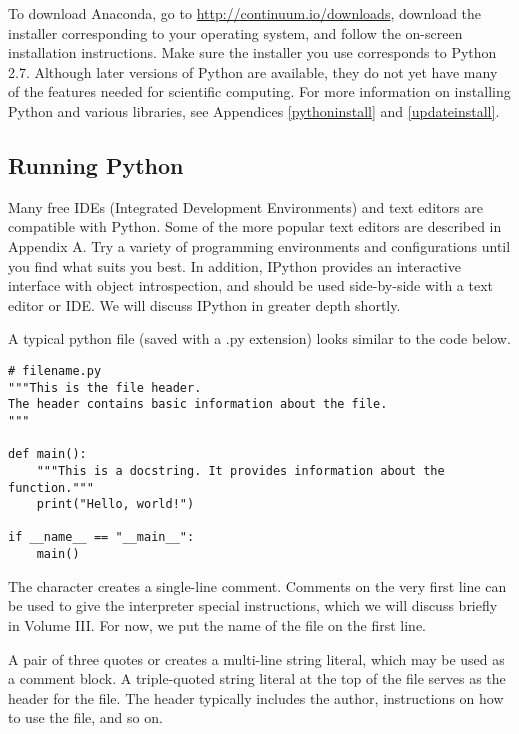 To download Anaconda, go to \url{http://continuum.io/downloads}, download the installer corresponding to your operating system, and follow the on-screen installation instructions. 
Make sure the installer you use corresponds to Python 2.7.
Although later versions of Python are available, they do not yet have many of the features needed for scientific computing. %
For more information on installing Python and various libraries, see Appendices \ref{pythoninstall} and \ref{updateinstall}.

\subsection*{Running Python} %

Many free IDEs (Integrated Development Environments) and text editors are compatible with Python.
Some of the more popular text editors are described in Appendix A.
Try a variety of programming environments and configurations until you find what suits you best.
In addition, IPython provides an interactive interface with object introspection, and should be used side-by-side with a text editor or IDE.
We will discuss IPython in greater depth shortly.

A typical python file (saved with a .py extension) looks similar to the code below.

\begin{lstlisting}
# filename.py
"""This is the file header.
The header contains basic information about the file.
"""

def main():
    """This is a docstring. It provides information about the function."""
    print("Hello, world!")

if __name__ == "__main__":
    main()
\end{lstlisting}

The \li{#} character creates a single-line comment.
Comments on the very first line can be used to give the interpreter special instructions, which we will discuss briefly in Volume III.
For now, we put the name of the file on the first line. 

A pair of three quotes  or  creates a multi-line string literal, which may be used as a comment block.
A triple-quoted string literal at the top of the file serves as the header for the file.
The header typically includes the author, instructions on how to use the file, and so on.

